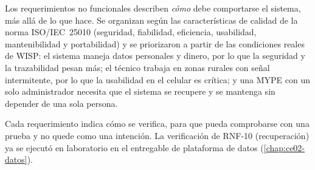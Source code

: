 Los requerimientos no funcionales describen \emph{cómo} debe comportarse el sistema, más
allá de lo que hace. Se organizan según las características de calidad de la norma
ISO/IEC~25010 (seguridad, fiabilidad, eficiencia, usabilidad, mantenibilidad y
portabilidad) y se priorizaron a partir de las condiciones reales de WISP: el sistema
maneja datos personales y dinero, por lo que la seguridad y la trazabilidad pesan más; el
técnico trabaja en zonas rurales con señal intermitente, por lo que la usabilidad en el
celular es crítica; y una MYPE con un solo administrador necesita que el sistema se
recupere y se mantenga sin depender de una sola persona.

Cada requerimiento indica cómo se verifica, para que pueda comprobarse con una prueba y no
quede como una intención. La verificación de RNF-10 (recuperación) ya se ejecutó en
laboratorio en el entregable de plataforma de datos (\cref{chap:ce02-datos}).

